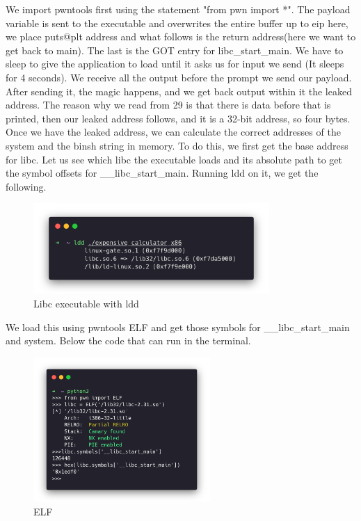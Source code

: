 We import pwntools first using the statement "from pwn import *". The payload
variable is sent to the executable and overwrites the entire buffer up to eip
here, we place puts@plt address and what follows is the return address(here we
want to get back to main). The last is the GOT entry for libc\_start\_main. We
have to sleep to give the application to load until it asks us for input we send
(It sleeps for 4 seconds). We receive all the output before the prompt we send
our payload. After sending it, the magic happens, and we get back output within
it the leaked address. The reason why we read from 29 is that there is data
before that is printed, then our leaked address follows, and it is a 32-bit
address, so four bytes. Once we have the leaked address, we can calculate the
correct addresses of the system and the binsh string in memory. To do this, we
first get the base address for libc. Let us see which libc the executable loads
and its absolute path to get the symbol offsets for \_\_libc\_start\_main.
Running ldd on it, we get the following.

\begin{figure}[H]
  \centering
  \includegraphics[width=0.8\textwidth]{figures/ldd}
  \caption{Libc executable with ldd}
  \label{f:ldd}
\end{figure}

We load this using pwntools ELF and get those symbols for \_\_libc\_start\_main
and system. Below the code that can run in the terminal.

\begin{figure}[H]
  \centering
  \includegraphics[width=0.6\textwidth]{figures/load-elf}
  \caption{ELF}
  \label{f:load-elf}
\end{figure}

